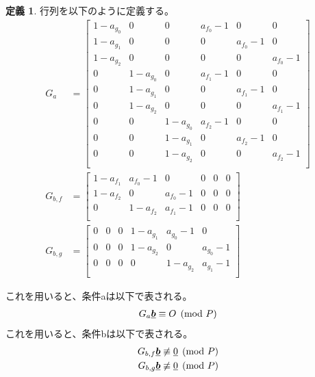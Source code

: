\documentclass[a4paper,11pt,dvipdfmx]{jsarticle}
\theoremstyle{definition}
\newtheorem{definition}{定義}[section]
\begin{document}
\begin{definition}
  行列を以下のように定義する。
  \begin{align}
  G_a &= \begin{bmatrix}
        1-a_{g_0} & 0 & 0 & a_{f_0}-1 & 0 & 0\\ %
        1-a_{g_1} & 0 & 0 & 0 & a_{f_0}-1 & 0\\ %
        1-a_{g_2} & 0 & 0 & 0 & 0 & a_{f_0}-1\\ %
        0 & 1-a_{g_0} & 0 & a_{f_1}-1 & 0 & 0\\ %
        0 & 1-a_{g_1} & 0 & 0 & a_{f_1}-1 & 0\\ %
        0 & 1-a_{g_2} & 0 & 0 & 0 & a_{f_1}-1\\ %
        0 & 0 & 1-a_{g_0} & a_{f_2}-1 & 0 & 0\\ %
        0 & 0 & 1-a_{g_1} & 0 & a_{f_2}-1 & 0\\ %
        0 & 0 & 1-a_{g_2} & 0 & 0 & a_{f_2}-1\\ %
  \end{bmatrix}\\
  G_{b,f} &= \begin{bmatrix}
        1-a_{f_1} & a_{f_0}-1 & 0 & 0 & 0 & 0\\ %
        1-a_{f_2} & 0 & a_{f_0}-1 & 0 & 0 & 0\\ %
        0 & 1-a_{f_2} & a_{f_1}-1 & 0 & 0 & 0\\ %
  \end{bmatrix}\\
  G_{b,g} &= \begin{bmatrix}
        0 & 0 & 0 & 1-a_{g_1} & a_{g_0}-1 & 0\\ %
        0 & 0 & 0 & 1-a_{g_2} & 0 & a_{g_0}-1\\ %
        0 & 0 & 0 & 0 & 1-a_{g_2} & a_{g_1}-1\\ %
  \end{bmatrix}
\end{align}

\end{definition}

これを用いると、条件aは以下で表される。
\begin{align}\label{eq:cond_a_mat}
  G_a\underline{\bm{b}} \equiv O \pmod P
\end{align}
これを用いると、条件bは以下で表される。
\begin{align}
  G_{b,f} \underline{\bm{b}} \not\equiv \underline{0} \pmod P\label{eq:cond_b_mat_f1}\\
  G_{b,g} \underline{\bm{b}} \not\equiv \underline{0} \pmod P\label{eq:cond_b_mat_g1}
\end{align}
\end{document}
